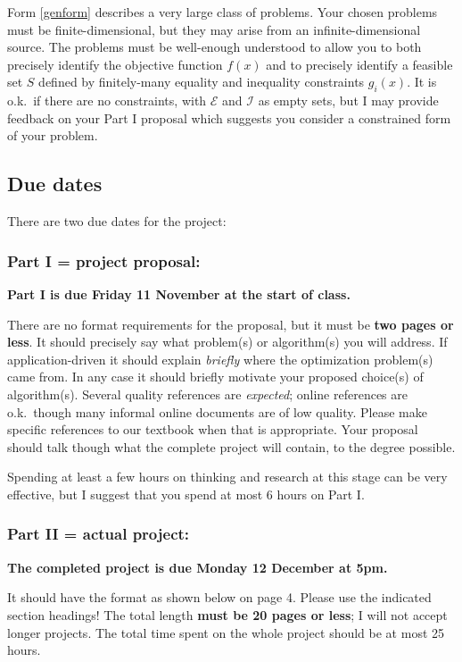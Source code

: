 \documentclass[12pt]{amsart}
\begin{document}
Form \eqref{genform} describes a very large class of problems.  Your chosen problems must be finite-dimensional, but they may arise from an infinite-dimensional source.  The problems must be well-enough understood to allow you to both precisely identify the objective function $f(x)$ and to precisely identify a feasible set $S$ defined by finitely-many equality and inequality constraints $g_i(x)$.  It is o.k.~if there are no constraints, with $\mathcal{E}$ and $\mathcal{I}$ as empty sets, but I may provide feedback on your Part I proposal which suggests you consider a constrained form of your problem.


\subsection*{Due dates}  There are two due dates for the project:

\subsubsection*{Part I = project proposal:}  \textbf{Part I is due Friday 11 November at the start of class.}

There are no format requirements for the proposal, but it must be \textbf{two pages or less}.  It should precisely say what problem(s) or algorithm(s) you will address.  If application-driven it should explain \emph{briefly} where the optimization problem(s) came from.  In any case it should briefly motivate your proposed choice(s) of algorithm(s).  Several quality references are \emph{expected}; online references are o.k.~though many informal online documents are of low quality.  Please make specific references to our textbook when that is appropriate.  Your proposal should talk though what the complete project will contain, to the degree possible.

Spending at least a few hours on thinking and research at this stage can be very effective, but I suggest that you spend at most 6 hours on Part I.

\subsubsection*{Part II = actual project:}  \textbf{The completed project is due Monday 12 December at 5pm.}

It should have the format as shown below on page 4.  Please use the indicated section headings!  The total length \textbf{must be 20 pages or less}; I will not accept longer projects.  The total time spent on the whole project should be at most 25 hours.
\end{document}
